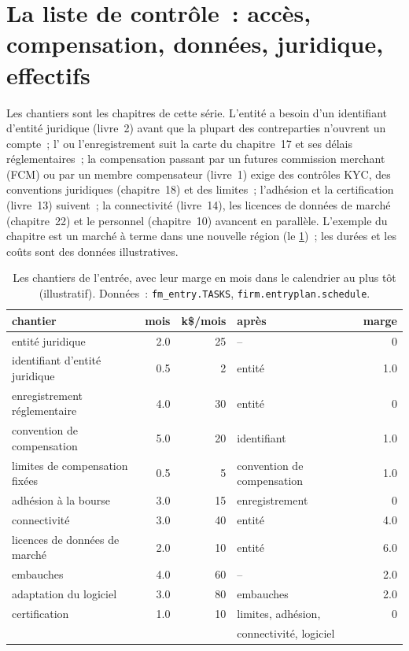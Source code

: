 \section{La liste de contrôle~: accès, compensation, données, juridique, effectifs}

Les chantiers sont les chapitres de cette série. L'entité a besoin d'un identifiant d'entité juridique (livre~2) avant que la plupart des contreparties n'ouvrent un
compte~; l' ou l'enregistrement suit la carte du chapitre~17 et ses délais réglementaires~; la compensation passant par un futures commission merchant (FCM) ou par
un membre compensateur (livre~1) exige des contrôles KYC, des conventions juridiques (chapitre~18) et des limites~; l'adhésion et la certification (livre~13) suivent~;
la connectivité (livre~14), les licences de données de marché (chapitre~22) et le personnel (chapitre~10) avancent en parallèle. L'exemple du chapitre est un marché à terme dans une nouvelle
région (le \cref{tab:fm:entering-a-new-market:tasks})~; les durées et les coûts sont des données illustratives.

\begin{table}[ht]
\centering\small
\begin{tabular}{lrrlr}
\toprule
chantier & mois & k\$/mois & après & marge \\
\midrule
entité juridique & 2.0 & 25 & -- & 0 \\
identifiant d'entité juridique & 0.5 & 2 & entité & 1.0 \\
enregistrement réglementaire & 4.0 & 30 & entité & 0 \\
convention de compensation & 5.0 & 20 & identifiant & 1.0 \\
limites de compensation fixées & 0.5 & 5 & convention de compensation & 1.0 \\
adhésion à la bourse & 3.0 & 15 & enregistrement & 0 \\
connectivité & 3.0 & 40 & entité & 4.0 \\
licences de données de marché & 2.0 & 10 & entité & 6.0 \\
embauches & 4.0 & 60 & -- & 2.0 \\
adaptation du logiciel & 3.0 & 80 & embauches & 2.0 \\
certification & 1.0 & 10 & limites, adhésion, & 0 \\
 & & & connectivité, logiciel & \\
\bottomrule
\end{tabular}
\caption{Les chantiers de l'entrée, avec leur marge en mois dans le calendrier au plus tôt (illustratif). Données~: \texttt{fm\_entry.TASKS}, \texttt{firm.entryplan.schedule}.}\label{tab:fm:entering-a-new-market:tasks}
\end{table}


